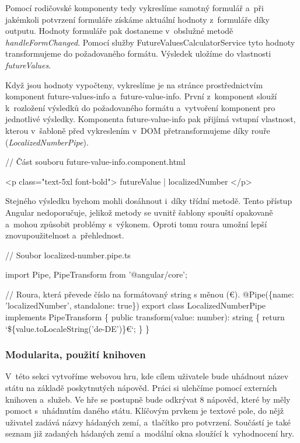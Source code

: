 Pomocí rodičovské komponenty tedy vykreslíme samotný formulář a~při jakémkoli potvrzení formuláře získáme aktuální hodnoty z~formuláře díky outputu. 
Hodnoty formuláře pak dostaneme v~obslužné metodě \emph{handleFormChanged}. Pomocí služby FutureValuesCalculatorService tyto hodnoty transformujeme do požadovaného formátu. 
Výsledek uložíme do vlastnosti \emph{futureValues}.

Když jsou hodnoty vypočteny, vykreslíme je na stránce prostřednictvím komponent future-values-info a~future-value-info. 
První z~komponent slouží k~rozložení výsledků do požadovaného formátu a~vytvoření komponent pro jednotlivé výsledky. 
Komponenta future-value-info pak přijímá vstupní vlastnost, kterou v~šabloně před vykreslením v~DOM přetransformujeme díky rouře (\emph{LocalizedNumberPipe}).

\begin{prog}
// Část souboru future-value-info.component.html

<p class="text-5xl font-bold">{{ futureValue | localizedNumber }}</p>
\end{prog}

Stejného výsledku bychom mohli dosáhnout i~díky třídní metodě. Tento přístup Angular nedoporučuje, jelikož metody se uvnitř šablony spouští opakovaně a~mohou způsobit problémy s~výkonem. 
Oproti tomu roura umožní lepší znovupoužitelnost a~přehlednost.

\newpage
\begin{prog}
// Soubor localized-number.pipe.ts

import {Pipe, PipeTransform} from '@angular/core';

// Roura, která převede číslo na formátovaný string s měnou (€).
@Pipe(\{name: 'localizedNumber', standalone: true\})
export class LocalizedNumberPipe implements PipeTransform \{
  public transform(value: number): string \{
    return `\$\{value.toLocaleString('de-DE')\}€`;
  \}
\}
\end{prog}

\subsubsection*{Modularita, použití knihoven}

V~této sekci vytvoříme webovou hru, kde cílem uživatele bude uhádnout název státu na základě poskytnutých nápověd. Práci si ulehčíme pomocí externích knihoven a~služeb.
Ve hře se postupně bude odkrývat 8 nápověd, které by měly pomoct s~uhádnutím daného státu. 
Klíčovým prvkem je textové pole, do nějž uživatel zadává názvy hádaných zemí, a~tlačítko pro potvrzení. 
Součástí je také seznam již zadaných hádaných zemí a~modální okna sloužící k~vyhodnocení hry.

